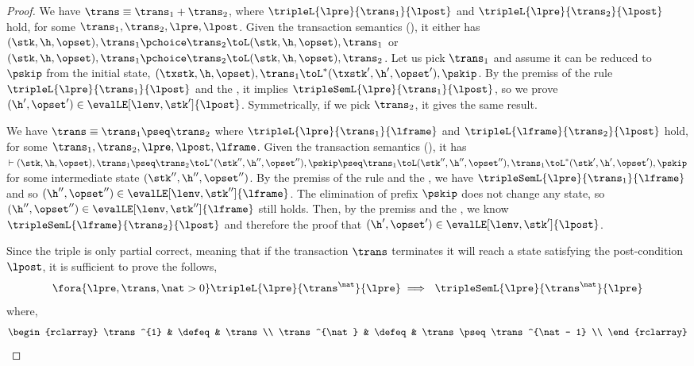 \begin{proof}

We have  \(\trans \equiv \trans_{1} + \trans_{2} \), where \( \tripleL{\lpre}{\trans_{1}}{\lpost} \) and \( \tripleL{\lpre}{\trans_{2}}{\lpost} \) hold, for some \( \trans_{1}, \trans_{2}, \lpre, \lpost \).
Given the transaction semantics (), it either has \( ( \stk, \h, \opset ), \trans_{1} \pchoice \trans_{2} \toL ( \stk, \h, \opset ), \trans_{1} \) or  \( ( \stk, \h, \opset ), \trans_{1} \pchoice \trans_{2} \toL ( \stk, \h, \opset ), \trans_{2} \).
Let us pick \( \trans_{1} \) and  assume it can be reduced to \( \pskip \) from the initial state, \ie \( ( \txstk, \h, \opset ), \trans_{1}  \toL^{*} ( \txstk', \h', \opset' ), \pskip \).
By the premiss of the rule \( \tripleL{\lpre}{\trans_{1}}{\lpost} \) and the \ih, it implies \( \tripleSemL{\lpre}{\trans_{1}}{\lpost} \), so we prove \( (\h', \opset') \in \evalLE[\lenv, \stk']{\lpost} \).
Symmetrically, if we pick \( \trans_{2} \), it gives the same result.


We have \( \trans \equiv \trans_{1} \pseq \trans_{2} \) where \( \tripleL{\lpre}{\trans_{1}}{\lframe} \) and \( \tripleL{\lframe}{\trans_{2}}{\lpost} \) hold, for some \( \trans_{1}, \trans_{2}, \lpre, \lpost, \lframe \).
Given the transaction semantics (), it has \( \vdash ( \stk, \h, \opset ), \trans_{1} \pseq \trans_{2} \toL^{*} ( \stk'', \h'', \opset'' ), \pskip \pseq \trans_{1} \toL ( \stk'', \h'', \opset'' ), \trans_{1} \toL^{*} ( \stk', \h', \opset' ), \pskip \) for some intermediate state \( (\stk'', \h'', \opset'') \).
By the premiss of the rule and the \ih, we have \( \tripleSemL{\lpre}{\trans_{1}}{\lframe} \) and so \( (\h'', \opset'') \in \evalLE[\lenv, \stk'']{\lframe} \).
The elimination of prefix \( \pskip\) does not change any state, so \( (\h'', \opset'') \in \evalLE[\lenv, \stk'']{\lframe} \) still holds.
Then, by the premiss and the \ih, we know \( \tripleSemL{\lframe}{\trans_{2}}{\lpost} \) and therefore the proof that \( (\h', \opset') \in \evalLE[\lenv, \stk']{\lpost} \).


Since the triple is only partial correct, meaning that if the transaction \( \trans \) terminates it will reach a state satisfying the post-condition \( \lpost \), it is sufficient to prove the follows,
\[
    \fora{\lpre, \trans, \nat > 0} \tripleL{\lpre}{\trans^{\nat}}{\lpre} \implies \ \tripleSemL{\lpre}{\trans^{\nat}}{\lpre} 
\]
where,
\[
\begin{rclarray}
    \trans^{1} & \defeq  & \trans \\
    \trans^{\nat} & \defeq  & \trans \pseq \trans^{\nat - 1} \\
\end{rclarray}
\]


\end{proof}
